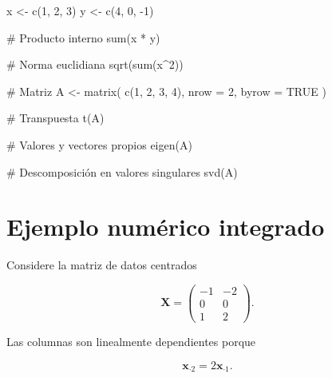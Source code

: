 \documentclass[
  spanish,
  10.5pt,
  letterpaper,
  DIV=11,
  numbers=noendperiod,
  oneside,
  open=any]{scrreprt}
\newenvironment{Shaded}{\begin{snugshade}}{\end{snugshade}}
\newcommand{\AttributeTok}[1]{\textcolor[rgb]{0.40,0.45,0.13}{#1}}
\newcommand{\CommentTok}[1]{\textcolor[rgb]{0.37,0.37,0.37}{#1}}
\newcommand{\ConstantTok}[1]{\textcolor[rgb]{0.56,0.35,0.01}{#1}}
\newcommand{\DecValTok}[1]{\textcolor[rgb]{0.68,0.00,0.00}{#1}}
\newcommand{\FunctionTok}[1]{\textcolor[rgb]{0.28,0.35,0.67}{#1}}
\newcommand{\NormalTok}[1]{\textcolor[rgb]{0.00,0.23,0.31}{#1}}
\newcommand{\OtherTok}[1]{\textcolor[rgb]{0.00,0.23,0.31}{#1}}
\newcommand{\SpecialCharTok}[1]{\textcolor[rgb]{0.37,0.37,0.37}{#1}}
\theoremstyle{definition}
\theoremstyle{definition}
\theoremstyle{plain}
\theoremstyle{remark}
\begin{document}
\begin{Shaded}
\begin{Highlighting}[numbers=left,,]
\NormalTok{x }\OtherTok{\textless{}{-}} \FunctionTok{c}\NormalTok{(}\DecValTok{1}\NormalTok{, }\DecValTok{2}\NormalTok{, }\DecValTok{3}\NormalTok{)}
\NormalTok{y }\OtherTok{\textless{}{-}} \FunctionTok{c}\NormalTok{(}\DecValTok{4}\NormalTok{, }\DecValTok{0}\NormalTok{, }\SpecialCharTok{{-}}\DecValTok{1}\NormalTok{)}

\CommentTok{\# Producto interno}
\FunctionTok{sum}\NormalTok{(x }\SpecialCharTok{*}\NormalTok{ y)}

\CommentTok{\# Norma euclidiana}
\FunctionTok{sqrt}\NormalTok{(}\FunctionTok{sum}\NormalTok{(x}\SpecialCharTok{\^{}}\DecValTok{2}\NormalTok{))}

\CommentTok{\# Matriz}
\NormalTok{A }\OtherTok{\textless{}{-}} \FunctionTok{matrix}\NormalTok{(}
  \FunctionTok{c}\NormalTok{(}\DecValTok{1}\NormalTok{, }\DecValTok{2}\NormalTok{,}
    \DecValTok{3}\NormalTok{, }\DecValTok{4}\NormalTok{),}
  \AttributeTok{nrow =} \DecValTok{2}\NormalTok{,}
  \AttributeTok{byrow =} \ConstantTok{TRUE}
\NormalTok{)}

\CommentTok{\# Transpuesta}
\FunctionTok{t}\NormalTok{(A)}

\CommentTok{\# Valores y vectores propios}
\FunctionTok{eigen}\NormalTok{(A)}

\CommentTok{\# Descomposición en valores singulares}
\FunctionTok{svd}\NormalTok{(A)}
\end{Highlighting}
\end{Shaded}

\section*{Ejemplo numérico
integrado}\label{ejemplo-numuxe9rico-integrado}


Considere la matriz de datos centrados

\[
\mathbf{X}
=
\begin{pmatrix}
-1 & -2\\
0 & 0\\
1 & 2
\end{pmatrix}.
\]

Las columnas son linealmente dependientes porque

\[
\mathbf{x}_{\cdot 2}
=
2\mathbf{x}_{\cdot 1}.
\]
\end{document}

